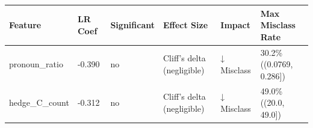 \begin{tabular}{llllll}
\toprule
Feature & LR Coef & Significant & Effect Size & Impact & Max Misclass Rate \\
\midrule
pronoun\_ratio & -0.390 & no & Cliff's delta (negligible) & ↓ Misclass & 30.2\% ((0.0769, 0.286]) \\
hedge\_C\_count & -0.312 & no & Cliff's delta (negligible) & ↓ Misclass & 49.0\% ((20.0, 49.0]) \\
\bottomrule
\end{tabular}
